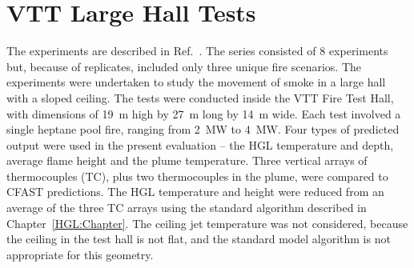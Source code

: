 \FloatBarrier

\section{VTT Large Hall Tests}

The experiments are described in Ref.~\cite{Hostikka:2001}. The series consisted of 8 experiments but, because of replicates, included only three unique fire scenarios. The experiments were undertaken to study the movement of smoke in a large hall with a sloped ceiling. The tests were conducted inside the VTT Fire Test Hall, with dimensions of 19~m high by 27~m long by 14~m wide. Each test involved a single heptane pool fire, ranging from 2~MW to 4~MW. Four types of predicted output were used in the present evaluation -- the HGL temperature and depth, average flame height and the plume temperature. Three vertical arrays of thermocouples (TC), plus two thermocouples in the plume, were compared to CFAST predictions. The HGL temperature and height were reduced from an average of the three TC arrays using the standard algorithm described in Chapter~\ref{HGL:Chapter}. The ceiling jet temperature was not considered, because the ceiling in the test hall is not flat, and the standard model algorithm is not appropriate for this geometry.

